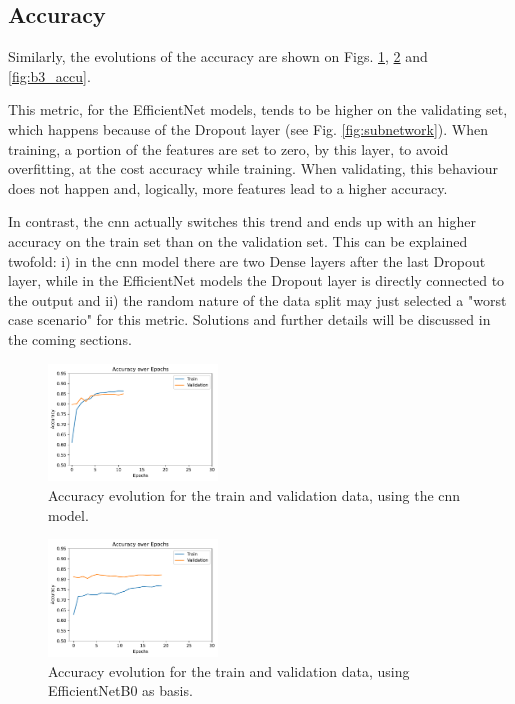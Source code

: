 \documentclass[conference]{IEEEtran}
\begin{document}
\subsection{Accuracy}

Similarly, the evolutions of the accuracy are shown on Figs. \ref{fig:cnn_accu}, \ref{fig:b0_accu} and \ref{fig:b3_accu}. 

This metric, for the EfficientNet models, tends to be higher on the validating set, which happens because of the Dropout layer (see Fig. \ref{fig:subnetwork}). When training, a portion of the features are set to zero, by this layer, to avoid overfitting, at the cost accuracy while training. When validating, this behaviour does not happen and, logically, more features lead to a higher accuracy.

In contrast, the \gls{cnn} actually switches this trend and ends up with an higher accuracy on the train set than on the validation set. This can be explained twofold: i) in the \gls{cnn} model there are two Dense layers after the last Dropout layer, while in the EfficientNet models the Dropout layer is directly connected to the output and ii) the random nature of the data split may just selected a "worst case scenario" for this metric. Solutions and further details will be discussed in the coming sections.

\begin{figure}[htp]
    \centering
    \includegraphics[width=0.4\textwidth]{imgs/cnn_accu.pdf}
    \caption{Accuracy evolution for the train and validation data, using the \gls{cnn} model.}
    \label{fig:cnn_accu}
\end{figure}

\begin{figure}[htp]
    \centering
    \includegraphics[width=0.4\textwidth]{imgs/EfficientNetB0_accu.pdf}
    \caption{Accuracy evolution for the train and validation data, using EfficientNetB0 as basis.}
    \label{fig:b0_accu}
\end{figure}
\end{document}

